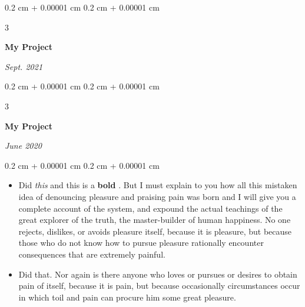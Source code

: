 \documentclass[10pt, letterpaper]{article}
\newenvironment{highlights}{
    \begin{itemize}[
        topsep=0.10 cm,
        parsep=0.10 cm,
        partopsep=0pt,
        itemsep=0pt,
        leftmargin=0.4 cm + 10pt + 0.6 cm
    ]
}{
    \end{itemize}
} %
\newenvironment{onecolentry}{
    \begin{adjustwidth}{
        0.2 cm + 0.00001 cm
    }{
        0.2 cm + 0.00001 cm
    }
}{
    \end{adjustwidth}
} %
\newenvironment{threecolentry}[3][]{
    \onecolentry
    \def\thirdColumn{#3}
    \setcolumnwidth{0.6 cm, \fill, 4.5 cm}
    \begin{paracol}{3}
    #2 \switchcolumn
}{
    \switchcolumn \raggedleft \thirdColumn
    \end{paracol}
    \endonecolentry
} %
\let\hrefWithoutArrow\href
\renewcommand{\href}[2]{\hrefWithoutArrow{#1}{\mbox{\ifthenelse{\equal{#2}{}}{ }{#2 }\raisebox{.15ex}{\footnotesize \faExternalLink*}}}}
\begin{document}
        \vspace{0.2 cm-3px}

        \begin{threecolentry}{
            \vspace*{\fill}
            \textbullet
            \vspace*{3px}
            \vspace*{\fill}
        }{
            
            
        \textit{Sept. 2021}}
            \textbf{My Project}
        \end{threecolentry}



        \vspace{0.2 cm-3px}

        \begin{threecolentry}{
            \vspace*{\fill}
            \textbullet
            \vspace*{3px}
            \vspace*{\fill}
        }{
            
            
        \textit{June 2020}}
            \textbf{My Project}
        \end{threecolentry}

        \vspace{0.10 cm-3px}
        \begin{onecolentry}
            \begin{highlights}
                \item Did \textit{this} and this is a \textbf{bold} \href{https://example.com}{link}. But I must explain to you how all this mistaken idea of denouncing pleasure and praising pain was born and I will give you a complete account of the system, and expound the actual teachings of the great explorer of the truth, the master-builder of human happiness. No one rejects, dislikes, or avoids pleasure itself, because it is pleasure, but because those who do not know how to pursue pleasure rationally encounter consequences that are extremely painful.
                \item Did that. Nor again is there anyone who loves or pursues or desires to obtain pain of itself, because it is pain, but because occasionally circumstances occur in which toil and pain can procure him some great pleasure.
            \end{highlights}
        \end{onecolentry}
\end{document}
